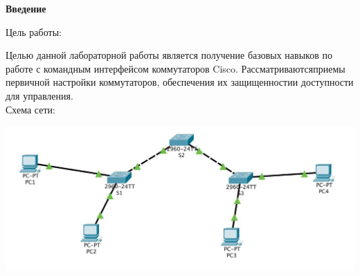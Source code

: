 \documentclass[a4paper,14pt]{extarticle}
\begin{document}
    \newpage
    \begin{center}
        \textbf{\large{ Введение}}
    \end{center}
    Цель работы:\par 
    Целью данной лабораторной работы является получение базовых навыков по 
    работе с командным интерфейсом коммутаторов Cisco. 
    Рассматриваютсяприемы первичной настройки коммутаторов, обеспечения их 
    защищенностии доступности для управления.\\

    Схема сети:\\
    \begin{center}
        \includegraphics[scale=0.5]{1.jpg}
    \end{center}
    
\end{document}
